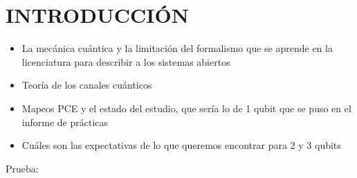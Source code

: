 \chapter{INTRODUCCIÓN}
\textcolor{mycolor}{
\begin{itemize}
\item La mecánica cuántica y la limitación del formalismo que se 
aprende en la licenciatura para describir a los sistemas abiertos
\item Teoría de los canales cuánticos
\item Mapeos PCE y el estado del estudio, que sería lo de 1
qubit que se puso en el informe de prácticas
\item Cuáles son las expectativas de lo que queremos encontrar 
para 2 y 3 qubits
\end{itemize}
}
Prueba:
\cite{bengtsson_zyczkowski_2017}